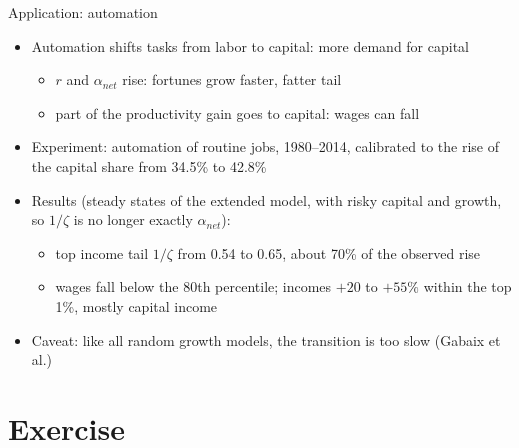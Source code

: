 \documentclass[10pt,english,10pt]{beamer}
\begin{document}
\begin{frame}{Application: automation}
\begin{itemize}
\item Automation shifts tasks from labor to capital: more demand for capital
\begin{itemize}
\item $r$ and $\alpha_{net}$ rise: fortunes grow faster, fatter tail
\item part of the productivity gain goes to capital: wages can fall
\end{itemize}
\item Experiment: automation of routine jobs, 1980--2014, calibrated to the rise of the capital share from 34.5\% to 42.8\%
\item Results (steady states of the extended model, with risky capital and growth, so $1/\zeta$ is no longer exactly $\alpha_{net}$):
\begin{itemize}
\item top income tail $1/\zeta$ from 0.54 to 0.65, about 70\% of the observed rise
\item wages fall below the 80th percentile; incomes $+20$ to $+55\%$ within the top 1\%, mostly capital income
\end{itemize}
\item Caveat: like all random growth models, the transition is too slow (Gabaix et al.)
\end{itemize}
\end{frame}

\section{Exercise}
\end{document}
